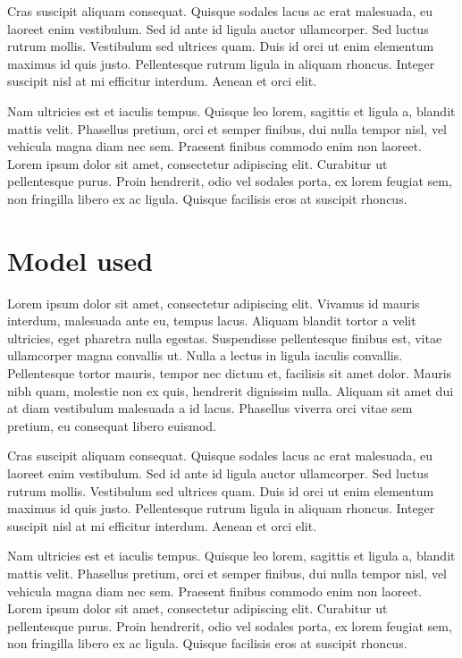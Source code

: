 \documentclass[a4paper, nobind]{templates/ociamthesis}
\theoremstyle{definition}
\theoremstyle{definition}
\theoremstyle{definition}
\theoremstyle{remark}
\begin{document}
Cras suscipit aliquam consequat. Quisque sodales lacus ac erat malesuada, eu laoreet enim vestibulum. Sed id ante id ligula auctor ullamcorper. Sed luctus rutrum mollis. Vestibulum sed ultrices quam. Duis id orci ut enim elementum maximus id quis justo. Pellentesque rutrum ligula in aliquam rhoncus. Integer suscipit nisl at mi efficitur interdum. Aenean et orci elit.

Nam ultricies est et iaculis tempus. Quisque leo lorem, sagittis et ligula a, blandit mattis velit. Phasellus pretium, orci et semper finibus, dui nulla tempor nisl, vel vehicula magna diam nec sem. Praesent finibus commodo enim non laoreet. Lorem ipsum dolor sit amet, consectetur adipiscing elit. Curabitur ut pellentesque purus. Proin hendrerit, odio vel sodales porta, ex lorem feugiat sem, non fringilla libero ex ac ligula. Quisque facilisis eros at suscipit rhoncus.

\hypertarget{model-used}{%
\section{Model used}\label{model-used}}

Lorem ipsum dolor sit amet, consectetur adipiscing elit. Vivamus id mauris interdum, malesuada ante eu, tempus lacus. Aliquam blandit tortor a velit ultricies, eget pharetra nulla egestas. Suspendisse pellentesque finibus est, vitae ullamcorper magna convallis ut. Nulla a lectus in ligula iaculis convallis. Pellentesque tortor mauris, tempor nec dictum et, facilisis sit amet dolor. Mauris nibh quam, molestie non ex quis, hendrerit dignissim nulla. Aliquam sit amet dui at diam vestibulum malesuada a id lacus. Phasellus viverra orci vitae sem pretium, eu consequat libero euismod.

Cras suscipit aliquam consequat. Quisque sodales lacus ac erat malesuada, eu laoreet enim vestibulum. Sed id ante id ligula auctor ullamcorper. Sed luctus rutrum mollis. Vestibulum sed ultrices quam. Duis id orci ut enim elementum maximus id quis justo. Pellentesque rutrum ligula in aliquam rhoncus. Integer suscipit nisl at mi efficitur interdum. Aenean et orci elit.

Nam ultricies est et iaculis tempus. Quisque leo lorem, sagittis et ligula a, blandit mattis velit. Phasellus pretium, orci et semper finibus, dui nulla tempor nisl, vel vehicula magna diam nec sem. Praesent finibus commodo enim non laoreet. Lorem ipsum dolor sit amet, consectetur adipiscing elit. Curabitur ut pellentesque purus. Proin hendrerit, odio vel sodales porta, ex lorem feugiat sem, non fringilla libero ex ac ligula. Quisque facilisis eros at suscipit rhoncus.
\end{document}
